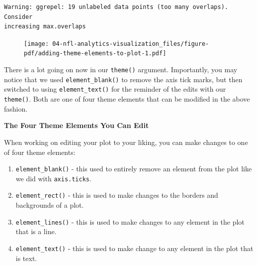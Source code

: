 \documentclass[
  letterpaper,
]{krantz}
\providecommand{\tightlist}{%
  \setlength{\itemsep}{0pt}\setlength{\parskip}{0pt}}\usepackage{longtable,booktabs,array}
\begin{document}
\begin{verbatim}
Warning: ggrepel: 19 unlabeled data points (too many overlaps). Consider
increasing max.overlaps
\end{verbatim}

\begin{figure}[H]

{\centering \texttt{[image: 04-nfl-analytics-visualization\_files/figure-pdf/adding-theme-elements-to-plot-1.pdf]}

}

\end{figure}

There is a lot going on now in our \texttt{theme()} argument.
Importantly, you may notice that we used \texttt{element\_blank()} to
remove the axis tick marks, but then switched to using
\texttt{element\_text()} for the reminder of the edits with our
\texttt{theme()}. Both are one of four theme elements that can be
modified in the above fashion.

\begin{tcolorbox}[enhanced jigsaw, left=2mm, toprule=.15mm, opacitybacktitle=0.6, leftrule=.75mm, bottomrule=.15mm, colbacktitle=quarto-callout-tip-color!10!white, breakable, colback=white, bottomtitle=1mm, toptitle=1mm, title=\textcolor{quarto-callout-tip-color}{\faLightbulb}\hspace{0.5em}{Tip}, coltitle=black, titlerule=0mm, arc=.35mm, opacityback=0, colframe=quarto-callout-tip-color-frame, rightrule=.15mm]

\textbf{The Four Theme Elements You Can Edit}

When working on editing your plot to your liking, you can make changes
to one of four theme elements:

\begin{enumerate}
\def\labelenumi{\arabic{enumi}.}
\tightlist
\item
  \texttt{element\_blank()} - this used to entirely remove an element
  from the plot like we did with \texttt{axis.ticks}.
\item
  \texttt{element\_rect()} - this is used to make changes to the borders
  and backgrounds of a plot.
\item
  \texttt{element\_lines()} - this is used to make changes to any
  element in the plot that is a line.
\item
  \texttt{element\_text()} - this is used to make change to any element
  in the plot that is text.
\end{enumerate}

\end{tcolorbox}
\end{document}
